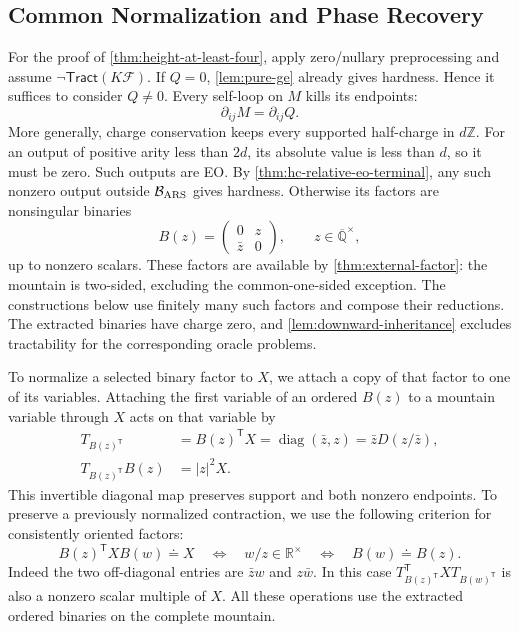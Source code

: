 \documentclass[11pt,letterpaper,onecolumn]{article}
\theoremstyle{plain}
\theoremstyle{definition}
\theoremstyle{remark}
\newcommand{\AlgNums}{\overline{\mathbb Q}}
\newcommand{\cF}{\mathcal F}
\newcommand{\Tract}{\mathsf{Tract}}
\newcommand{\diag}{\operatorname{diag}}
\begin{document}
	\subsection{Common Normalization and Phase Recovery}
	\label{subsec:hc-normalization}
	
	For the proof of \cref{thm:height-at-least-four}, apply zero/nullary
	preprocessing and assume \(\neg\Tract(K\cF)\).
	If \(Q=0\), \cref{lem:pure-ge} already gives hardness.  Hence it suffices to
	consider \(Q\ne0\).
	Every self-loop on \(M\) kills its endpoints:
	\begin{equation}
	\partial_{ij}M=\partial_{ij}Q.
	\label{eq:hc-central-card}
	\end{equation}
	More generally, charge conservation keeps every supported half-charge
	in \(d\mathbb Z\). For an output of positive arity less than \(2d\), its
	absolute value is less than \(d\), so it must be zero. Such outputs are EO.  By
	\cref{thm:hc-relative-eo-terminal}, any such nonzero output outside
	\(\mathcal B_{\rm ARS}\) gives hardness.  Otherwise its factors are
	nonsingular binaries
	\[
	B(z)=\begin{pmatrix}0&z\\\bar z&0\end{pmatrix},
	\qquad z\in\AlgNums^\times,
	\]
	up to nonzero scalars.
	These factors are available by \cref{thm:external-factor}: the mountain
	is two-sided, excluding the common-one-sided exception.  The constructions
	below use finitely many such factors and compose their reductions.
	The extracted binaries have charge zero, and
	\cref{lem:downward-inheritance} excludes tractability for the corresponding
	oracle problems.
	
	To normalize a selected binary factor to \(X\), we attach a copy of that
	factor to one of its variables. Attaching the first variable of an ordered \(B(z)\) to a mountain variable through
	\(X\) acts on that variable by
	\begin{equation}
	\begin{aligned}
T_{B(z)^{\mathsf T}}&=B(z)^{\mathsf T}X=\diag(\bar z,z)=\bar zD(z/\bar z),\\
T_{B(z)^{\mathsf T}}B(z)&=|z|^2X.
\end{aligned}
	\label{eq:hc-port-mating}
	\end{equation}
	This invertible diagonal map preserves support and both nonzero endpoints.
	To preserve a previously normalized contraction, we use the following
	criterion for consistently oriented factors:
	\begin{equation}
	B(z)^{\mathsf T}XB(w)\doteq X
	\quad\Longleftrightarrow\quad
	w/z\in\mathbb R^\times
	\quad\Longleftrightarrow\quad B(w)\doteq B(z).
	\label{eq:hc-binary-splice}
	\end{equation}
	Indeed the two off-diagonal entries are \(\bar z w\) and \(z\bar w\).
	In this case \(T_{B(z)^{\mathsf T}}^{\mathsf T}XT_{B(w)^{\mathsf T}}\) is also a nonzero scalar multiple of
	\(X\).  All these operations use the extracted ordered binaries on the
	complete mountain.  
	
\end{document}
